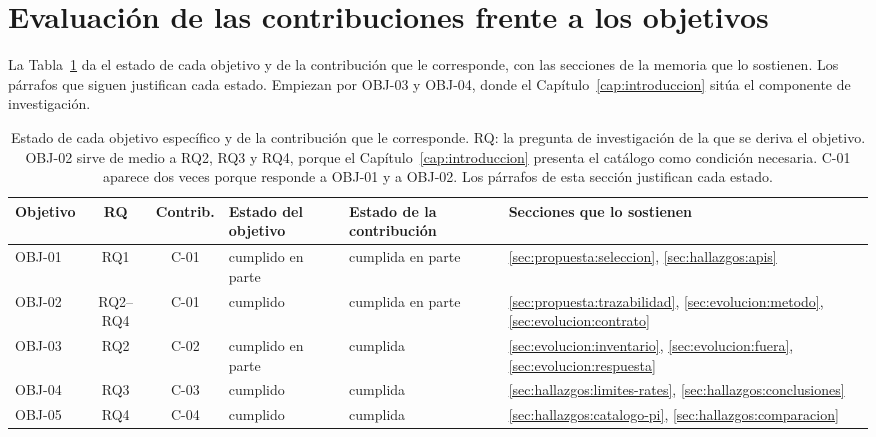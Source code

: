 \section{Evaluación de las contribuciones frente a los objetivos}\label{sec:conclusiones:evaluacion}

La Tabla~\ref{tab:conclusiones:evaluacion} da el estado de cada objetivo y de la contribución que le corresponde, con las secciones de la memoria que lo sostienen.
Los párrafos que siguen justifican cada estado.
Empiezan por OBJ-03 y OBJ-04, donde el Capítulo~\ref{cap:introduccion} sitúa el componente de investigación.

\begin{table}[H]
\centering
\small
\setlength{\tabcolsep}{3pt}
\begin{tabular}{|l|c|c|p{1.9cm}|p{2.3cm}|p{4.6cm}|}
\hline
\textbf{Objetivo} & \textbf{RQ} & \textbf{Contrib.} & \textbf{Estado del objetivo} & \textbf{Estado de la contribución} & \textbf{Secciones que lo sostienen} \\
\hline
OBJ-01 & RQ1 & C-01 & cumplido en parte & cumplida en parte & \ref{sec:propuesta:seleccion}, \ref{sec:hallazgos:apis} \\
\hline
OBJ-02 & RQ2--RQ4 & C-01 & cumplido & cumplida en parte & \ref{sec:propuesta:trazabilidad}, \ref{sec:evolucion:metodo}, \ref{sec:evolucion:contrato} \\
\hline
OBJ-03 & RQ2 & C-02 & cumplido en parte & cumplida & \ref{sec:evolucion:inventario}, \ref{sec:evolucion:fuera}, \ref{sec:evolucion:respuesta} \\
\hline
OBJ-04 & RQ3 & C-03 & cumplido & cumplida & \ref{sec:hallazgos:limites-rates}, \ref{sec:hallazgos:conclusiones} \\
\hline
OBJ-05 & RQ4 & C-04 & cumplido & cumplida & \ref{sec:hallazgos:catalogo-pi}, \ref{sec:hallazgos:comparacion} \\
\hline
\end{tabular}
\caption{Estado de cada objetivo específico y de la contribución que le corresponde. RQ: la pregunta de investigación de la que se deriva el objetivo. OBJ-02 sirve de medio a RQ2, RQ3 y RQ4, porque el Capítulo~\ref{cap:introduccion} presenta el catálogo como condición necesaria. C-01 aparece dos veces porque responde a OBJ-01 y a OBJ-02. Los párrafos de esta sección justifican cada estado.}
\label{tab:conclusiones:evaluacion}
\end{table}

